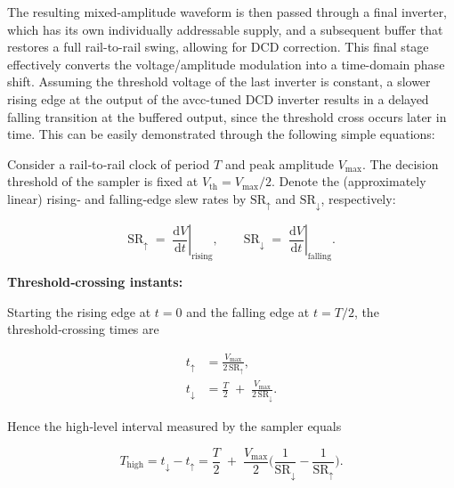 The resulting mixed-amplitude waveform is then passed through a final inverter, which has its own individually addressable supply, and a subsequent buffer that restores a full rail-to-rail swing, allowing for DCD correction. This final stage effectively converts the voltage/amplitude modulation into a time-domain phase shift. Assuming the threshold voltage of the last inverter is constant, a slower rising edge at the output of the avcc-tuned DCD inverter results in a delayed falling transition at the buffered output, since the threshold cross occurs later in time.
This can be easily demonstrated through the following simple equations:

Consider a rail‑to‑rail clock of period \(T\) and peak amplitude
\(V_{\max}\).  The decision threshold of the sampler is fixed at
\(V_{\text{th}} = V_{\max}/2\).
Denote the (approximately linear) rising‑ and falling‑edge slew
rates by \(\text{SR}_{\uparrow}\) and \(\text{SR}_{\downarrow}\), respectively:

\begin{equation}
\text{SR}_{\uparrow} \;=\;
\left.\frac{\mathrm{d}V}{\mathrm{d}t}\right|_{\text{rising}},
\qquad
\text{SR}_{\downarrow} \;=\;
\left.\frac{\mathrm{d}V}{\mathrm{d}t}\right|_{\text{falling}}.
\label{eq:slew_def}
\end{equation}

\textbf{Threshold‑crossing instants:}

Starting the rising edge at \(t=0\) and the falling edge at
\(t = T/2\), the threshold‑crossing times are

\begin{subequations}\label{eq:t_cross}
\begin{align}
t_{\uparrow}   &= \frac{V_{\max}}{2\,\text{SR}_{\uparrow}},
\label{eq:t_up} \\[2pt]
t_{\downarrow} &= \frac{T}{2} \;+\;
                 \frac{V_{\max}}{2\,\text{SR}_{\downarrow}}.
\label{eq:t_down}
\end{align}
\end{subequations}

Hence the high‑level interval measured by the sampler equals

\begin{equation}
T_{\text{high}}
    = t_{\downarrow} - t_{\uparrow}
    = \frac{T}{2} \;+\;
      \frac{V_{\max}}{2}
      \biggl(
         \frac{1}{\text{SR}_{\downarrow}}
        -\frac{1}{\text{SR}_{\uparrow}}
      \biggr).
\end{equation}

